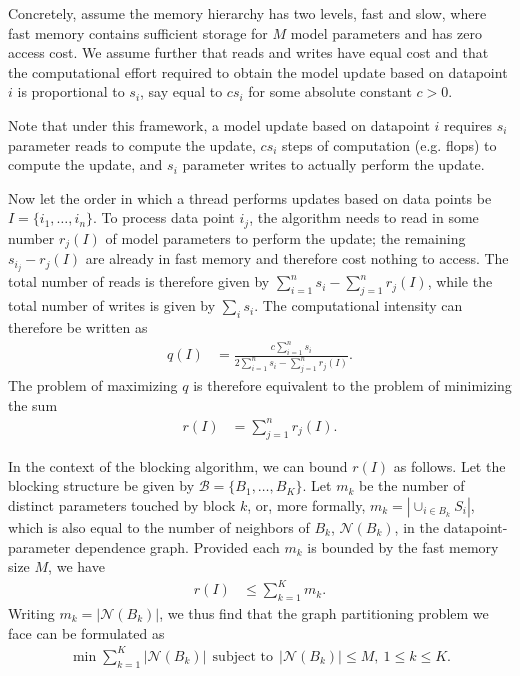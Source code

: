 \documentclass[times,11pt]{article}
\numberwithin{equation}{section}		%
\numberwithin{figure}{section}			%
\numberwithin{table}{section}				%
\newcommand{\blocks}{\mathcal{B}}
\newcommand{\neighs}[1]{\mathcal{N}\left({#1}\right)}
\begin{document}
Concretely, assume the memory hierarchy has two levels, fast and slow, where fast memory contains sufficient storage for $M$ model parameters and has zero access cost. We assume further that reads and writes have equal cost and that the computational effort required to obtain the model update based on datapoint $i$ is proportional to $s_{i}$, say equal to $cs_{i}$ for some absolute constant $c > 0$. 

Note that under this framework, a model update based on datapoint $i$ requires $s_{i}$ parameter reads to compute the update, $cs_{i}$ steps of computation (e.g. flops) to compute the update, and $s_{i}$ parameter writes to actually perform the update. 

Now let the order in which a thread performs updates based on data points be $I = \lbrace i_{1}, \dots, i_{n}\rbrace$. To process data point $i_{j}$, the
algorithm needs to read in some number $r_{j}\left(I\right)$ of model parameters to perform the update; the remaining $s_{i_j} - r_{j}\left(I\right)$ are
already in fast memory and therefore cost nothing to access. The total number of reads is therefore given by $\sum_{i = 1}^{n} s_{i} - \sum_{j = 1}^{n} r_{j}\left(I\right)$, while the total number of writes is given by $\sum_{i} s_i$. The computational intensity can therefore be written as
\begin{align}
q\left(I\right) & = \frac{c\sum_{i = 1}^{n} s_{i}}{2\sum_{i = 1}^{n} s_{i} - \sum_{j = 1}^{n} r_{j}\left(I\right)} . 
\end{align}
The problem of maximizing $q$ is therefore equivalent to the problem of minimizing the sum
\begin{align}
r\left(I\right) & = \sum_{j = 1}^{n} r_{j}\left(I\right) . 
\end{align}

In the context of the blocking algorithm, we can bound $r\left(I\right)$ as follows. Let the blocking structure be given by $\blocks = \lbrace B_{1}, \dots, B_{K} \rbrace$. Let $m_{k}$ be the number of distinct parameters touched by block $k$, or, more formally, $m_{k} = \left|\cup_{i \in B_{k}} S_{i}\right|$, which is also
equal to the number of neighbors of $B_{k}$, $\neighs{B_{k}}$, in the datapoint-parameter dependence graph. Provided each $m_{k}$ is bounded by the fast memory size $M$, we have
\begin{align}
r\left(I\right) & \leq \sum_{k = 1}^{K} m_{k} . 
\end{align}
Writing $m_{k} = \left|\neighs{B_{k}}\right|$, we thus find that the graph partitioning problem we face can be formulated as
\begin{align}\label{eq:comb-opt}
\min \sum_{k = 1}^{K} \left|\neighs{B_{k}}\right| ~~ \text{subject to}~~ \left|\neighs{B_{k}}\right| \leq M,~ 1 \leq k \leq K .
\end{align}
\end{document}

